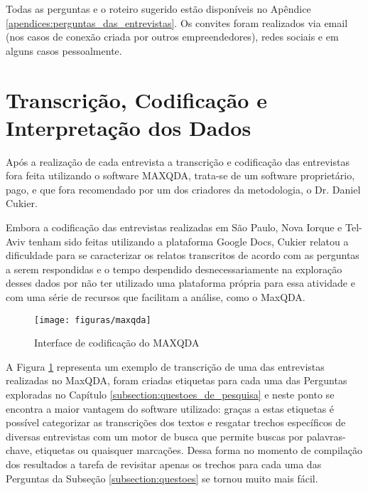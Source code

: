 Todas as perguntas e o roteiro sugerido estão disponíveis no Apêndice \ref{apendices:perguntas_das_entrevistas}. Os convites foram realizados via email (nos casos de conexão criada por outros empreendedores), redes sociais e em alguns casos pessoalmente. 

\section{Transcrição, Codificação e Interpretação dos Dados}
\label{subsection:codificacao_e_interpretacao_dos_dados}

Após a realização de cada entrevista a transcrição e codificação das entrevistas fora feita utilizando o software MAXQDA, trata-se de um software proprietário, pago, e que fora recomendado por um dos criadores da metodologia, o Dr. Daniel Cukier. 

Embora a codificação das entrevistas realizadas em São Paulo, Nova Iorque e Tel-Aviv tenham sido feitas utilizando a plataforma Google Docs, Cukier relatou a dificuldade para se caracterizar os relatos transcritos de acordo com as perguntas a serem respondidas e o tempo despendido desnecessariamente na exploração desses dados por não ter utilizado uma plataforma própria para essa atividade e com uma série de recursos que facilitam a análise, como o MaxQDA.

\begin{figure}[!htb]
	\centering
	\texttt{[image: figuras/maxqda]}
	\caption{Interface de codificação do MAXQDA}
	\label{figure:maxqda}
\end{figure}

A Figura \ref{figure:maxqda} representa um exemplo de transcrição de uma das entrevistas realizadas no MaxQDA, foram criadas etiquetas para cada uma das Perguntas exploradas no Capítulo \ref{subsection:questoes_de_pesquisa} e neste ponto se encontra a maior vantagem do software utilizado: graças a estas etiquetas é possível categorizar as transcrições dos textos e resgatar trechos específicos de diversas entrevistas com um motor de busca que permite buscas por palavras-chave, etiquetas ou quaisquer marcações. Dessa forma no momento de compilação dos resultados a tarefa de revisitar apenas os trechos para cada uma das Perguntas da Subseção \ref{subsection:questoes} se tornou muito mais fácil.